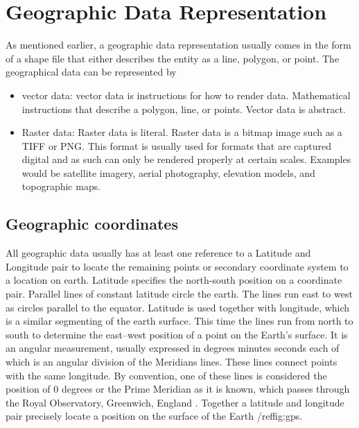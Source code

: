 \documentclass[10pt, conference, compsocconf]{IEEEtran}
\begin{document}
\section{Geographic Data Representation}
As mentioned earlier, a geographic data representation usually comes in the form of a shape file that either describes the entity as a line, polygon, or point. The geographical data can be represented by 
\begin{itemize}
    \item vector data: vector data is instructions for how to render data. Mathematical instructions that describe a polygon, line, or points. Vector data is abstract.
    \item Raster data: Raster data is literal. Raster data is a bitmap image such as a TIFF or PNG. This format is usually used for formats that are captured digital and as such can only be rendered properly at certain scales. Examples would be satellite imagery, aerial photography, elevation models, and topographic maps.
\end{itemize}
\subsection{Geographic coordinates}
All geographic data usually has at least one reference to a Latitude and Longitude pair to locate the remaining points or secondary coordinate system to a location on earth. Latitude specifies the north-south position on a coordinate pair. Parallel lines of constant latitude circle the earth. The lines run east to west as circles parallel to the equator. Latitude is used together with longitude, which is a similar segmenting of the earth surface. This time the lines run from north to south to determine the east–west position of a point on the Earth's surface. It is an angular measurement, usually expressed in degrees minutes seconds each of which is an angular division of the Meridians lines. These lines connect points with the same longitude. By convention, one of these lines is considered the position of 0 degrees or the Prime Meridian as it is known, which passes through the Royal Observatory, Greenwich, England \cite{Larson:1996wq}. Together a latitude and longitude pair precisely locate a position on the surface of the Earth /ref{fig:gps}.
\end{document}
